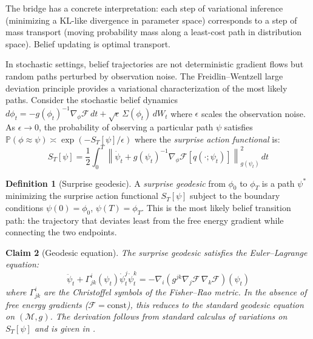 \documentclass[11pt,a4paper]{article}
\newtheorem{claim}{Claim}[section]
\theoremstyle{definition}
\newtheorem{definition}[claim]{Definition}
\newcommand{\VFE}{\mathcal{F}}
\newcommand{\cM}{\mathcal{M}}
\begin{document}
The bridge has a concrete interpretation: each step of variational inference (minimizing a KL-like divergence in parameter space) corresponds to a step of mass transport (moving probability mass along a least-cost path in distribution space). Belief updating is optimal transport.

In stochastic settings, belief trajectories are not deterministic gradient flows but random paths perturbed by observation noise. The Freidlin--Wentzell large deviation principle \citep{freidlin2012random} provides a variational characterization of the most likely paths. Consider the stochastic belief dynamics $d\phi_t = -g(\phi_t)^{-1} \nabla_\phi \VFE \, dt + \sqrt{\epsilon} \, \Sigma(\phi_t) \, dW_t$ where $\epsilon$ scales the observation noise. As $\epsilon \to 0$, the probability of observing a particular path $\psi$ satisfies $\mathbb{P}(\phi \approx \psi) \asymp \exp(-S_T[\psi]/\epsilon)$ where the \emph{surprise action functional} is:
\begin{equation}
  S_T[\psi] = \frac{1}{2} \int_0^T \left\|\dot{\psi}_t + g(\psi_t)^{-1} \nabla_\phi \VFE[q(\cdot; \psi_t)]\right\|^2_{g(\psi_t)} \, dt
  \label{eq:surprise_action}
\end{equation}

\begin{definition}[Surprise geodesic]
\label{def:surprise_geodesic}
A \emph{surprise geodesic} from $\phi_0$ to $\phi_T$ is a path $\psi^*$ minimizing the surprise action functional $S_T[\psi]$ subject to the boundary conditions $\psi(0) = \phi_0$, $\psi(T) = \phi_T$. This is the most likely belief transition path: the trajectory that deviates least from the free energy gradient while connecting the two endpoints.
\end{definition}

\begin{claim}[Geodesic equation]
\label{claim:geodesic_equation}
The surprise geodesic satisfies the Euler--Lagrange equation:
\begin{equation}
  \ddot{\psi}_t + \Gamma_{jk}^i(\psi_t) \dot{\psi}_t^j \dot{\psi}_t^k = -\nabla_i\left(g^{jk} \nabla_j \VFE \, \nabla_k \VFE\right)(\psi_t)
  \label{eq:geodesic_el}
\end{equation}
where $\Gamma_{jk}^i$ are the Christoffel symbols of the Fisher--Rao metric. In the absence of free energy gradients ($\VFE = \mathrm{const}$), this reduces to the standard geodesic equation on $(\cM, g)$. The derivation follows from standard calculus of variations on $S_T[\psi]$ and is given in .
\end{claim}
\end{document}
